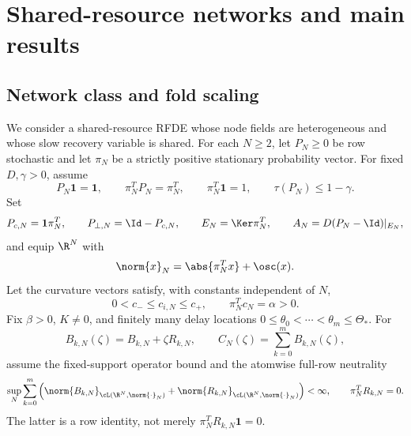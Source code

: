 \section{Shared-resource networks and main results}\label{sec:model-results}

\subsection{Network class and fold scaling}

We consider a shared-resource RFDE whose node fields are heterogeneous and
whose slow recovery variable is shared.  For each \(N\ge2\), let
\(P_N\ge0\) be row stochastic and let \(\pi_N\) be a strictly positive
stationary probability vector.  For fixed \(D,\gamma>0\), assume
\begin{equation}
 P_N\mathbf1=\mathbf1,\qquad
 \pi_N^TP_N=\pi_N^T,\qquad \pi_N^T\mathbf1=1,\qquad
 \tau(P_N)\le1-\gamma.                                \label{eq:shared-markov}
\end{equation}
Set
\begin{equation}
 P_{c,N}=\mathbf1\pi_N^T,\qquad P_{\perp,N}=\Id-P_{c,N},\qquad
 E_N=\Ker\pi_N^T,\qquad A_N=D(P_N-\Id)|_{E_N},       \label{eq:shared-splitting}
\end{equation}
and equip \(\R^N\) with
\begin{equation}
 \norm{x}_N=\abs{\pi_N^Tx}+\osc(x).                   \label{eq:shared-norm}
\end{equation}
Let the curvature vectors satisfy, with constants independent of \(N\),
\begin{equation}
 0<c_-\le c_{i,N}\le c_+,\qquad \pi_N^Tc_N=\alpha>0. \label{eq:shared-curvature}
\end{equation}
Fix \(\beta>0\), \(K\ne0\), and finitely many delay locations
\(0\le\theta_0<\cdots<\theta_m\le\Theta_*\).  For
\begin{equation}
 B_{k,N}(\zeta)=B_{k,N}+\zeta R_{k,N},\qquad
 C_N(\zeta)=\sum_{k=0}^mB_{k,N}(\zeta),                \label{eq:shared-layers}
\end{equation}
assume the fixed-support operator bound and the atomwise full-row
neutrality
\begin{equation}
 \sup_N\sum_{k=0}^m
 \left(\norm{B_{k,N}}_{\cL(\R^N,\norm{\cdot}_N)}
       +\norm{R_{k,N}}_{\cL(\R^N,\norm{\cdot}_N)}\right)<\infty,
 \qquad \pi_N^TR_{k,N}=0.                             \label{eq:shared-layer-bounds}
\end{equation}
The latter is a row identity, not merely
\(\pi_N^TR_{k,N}\mathbf1=0\).

